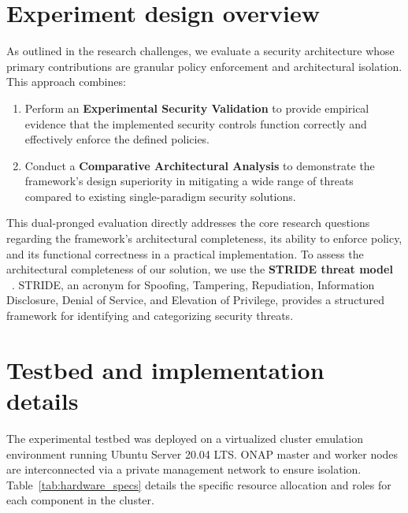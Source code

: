 \documentclass[12pt, a4paper, reqno, oneside]{book}
\begin{document}
\section{Experiment design overview}
\label{sec:eval_methodology}

As outlined in the research challenges, we evaluate a security architecture whose primary contributions are granular policy enforcement and architectural isolation. This approach combines:

\begin{enumerate}
    \item Perform an \textbf{Experimental Security Validation} to provide empirical evidence that the implemented security controls function correctly and effectively enforce the defined policies.
    
    \item Conduct a \textbf{Comparative Architectural Analysis} to demonstrate the framework's design superiority in mitigating a wide range of threats compared to existing single-paradigm security solutions.

\end{enumerate}
This dual-pronged evaluation directly addresses the core research questions regarding the framework's architectural completeness, its ability to enforce policy, and its functional correctness in a practical implementation. To assess the architectural completeness of our solution, we use the \textbf{STRIDE threat model} ~\cite{Khan2017stride, ruffy2016stride}. STRIDE, an acronym for Spoofing, Tampering, Repudiation, Information Disclosure, Denial of Service, and Elevation of Privilege, provides a structured framework for identifying and categorizing security threats. 

\section{Testbed and implementation details}

The experimental testbed was deployed on a virtualized cluster emulation environment running Ubuntu Server 20.04 LTS. ONAP master and worker nodes are interconnected via a private management network to ensure isolation. Table~\ref{tab:hardware_specs} details the specific resource allocation and roles for each component in the cluster.
\end{document}
